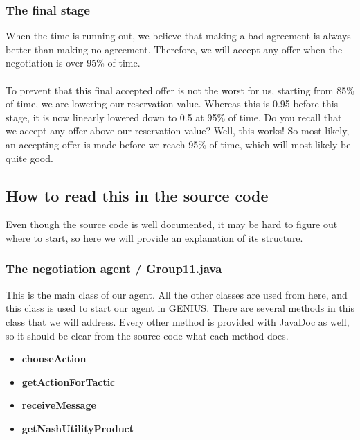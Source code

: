 \subsubsection{The final stage}
\label{sec:finalstage}
When the time is running out, we believe that making a bad agreement is always better than making no agreement. Therefore, we will accept any offer when the negotiation is over 95\% of time.
\\\\
To prevent that this final accepted offer is not the worst for us, starting from 85\% of time, we are lowering our reservation value. Whereas this is 0.95 before this stage, it is now linearly lowered down to 0.5 at 95\% of time. Do you recall that we accept any offer above our reservation value? Well, this works! So most likely, an accepting offer is made before we reach 95\% of time, which will most likely be quite good.

\subsection{How to read this in the source code}
Even though the source code is well documented, it may be hard to figure out where to start, so here we will provide an explanation of its structure.

\subsubsection{The negotiation agent / Group11.java}
This is the main class of our agent. All the other classes are used from here, and this class is used to start our agent in GENIUS. There are several methods in this class that we will address. Every other method is provided with JavaDoc as well, so it should be clear from the source code what each method does.

\begin{itemize}
\item \textbf{chooseAction}
\item \textbf{getActionForTactic}
\item \textbf{receiveMessage}
\item \textbf{getNashUtilityProduct}
\end{itemize}

